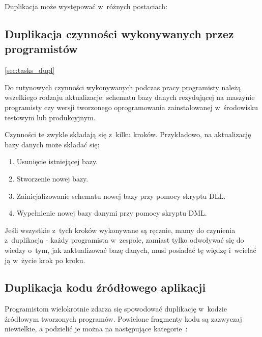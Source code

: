 Duplikacja może występować w~różnych postaciach:


\subsection{Duplikacja czynności wykonywanych przez programistów} \ref{sec:tasks_dupl}

Do rutynowych czynności wykonywanych podczas pracy programisty należą wszelkiego rodzaju aktualizacje: schematu bazy danych rezydującej na maszynie programisty czy wersji tworzonego oprogramowania zainstalowanej w~środowisku testowym lub produkcyjnym.

Czynności te zwykle składają się z~kilku kroków. Przykładowo, na aktualizację bazy danych może składać się:

\begin{enumerate}
 \item Usunięcie istniejącej bazy.
 \item Stworzenie nowej bazy.
 \item Zainicjalizowanie schematu nowej bazy przy pomocy skryptu DLL.
 \item Wypełnienie nowej bazy danymi przy pomocy skryptu DML.
\end{enumerate}

Jeśli wszystkie z~tych kroków wykonywane są ręcznie, mamy do czynienia z~duplikacją - każdy programista w~zespole, zamiast tylko odwoływać się do wiedzy o~tym, jak zaktualizować bazę danych, musi posiadać tę więdzę i~wcielać ją w~życie krok po kroku.


\subsection{Duplikacja kodu źródłowego aplikacji}

Programistom wielokrotnie zdarza się spowodować duplikację w~kodzie źródłowym tworzonych programów.
Powielone fragmenty kodu są zazwyczaj niewielkie, a podzielić je można na następujące kategorie~\cite{soft_sol_dupl}:

